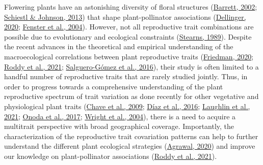 \documentclass[
  12pt,
  a4paper,
]{article}
\begin{document}
Flowering plants have an astonishing diversity of floral structures (\protect\hyperlink{ref-barrett2002}{Barrett, 2002}; \protect\hyperlink{ref-schiestl2013}{Schiestl \& Johnson, 2013}) that shape plant-pollinator associations (\protect\hyperlink{ref-dellinger2020}{Dellinger, 2020}; \protect\hyperlink{ref-fenster2004}{Fenster et al., 2004}). However, not all reproductive trait combinations are possible due to evolutionary and ecological constraints (\protect\hyperlink{ref-stearns1989}{Stearns, 1989}). Despite the recent advances in the theoretical and empirical understanding of the macroecological correlations between plant reproductive traits (\protect\hyperlink{ref-friedman2020}{Friedman, 2020}; \protect\hyperlink{ref-roddy2021}{Roddy et al., 2021}; \protect\hyperlink{ref-salguero2016}{Salguero-Gómez et al., 2016}), their study is often limited to a handful number of reproductive traits that are rarely studied jointly. Thus, in order to progress towards a comprehensive understanding of the plant reproductive spectrum of trait variation as done recently for other vegetative and physiological plant traits (\protect\hyperlink{ref-chave2009}{Chave et al., 2009}; \protect\hyperlink{ref-diaz2016}{Díaz et al., 2016}; \protect\hyperlink{ref-laughlin2021}{Laughlin et al., 2021}; \protect\hyperlink{ref-onoda2017}{Onoda et al., 2017}; \protect\hyperlink{ref-wright2004}{Wright et al., 2004}), there is a need to acquire a multitrait perspective with broad geographical coverage. Importantly, the characterization of the reproductive trait covariation patterns can help to further understand the different plant ecological strategies (\protect\hyperlink{ref-agrawal2020}{Agrawal, 2020}) and improve our knowledge on plant-pollinator associations (\protect\hyperlink{ref-roddy2021}{Roddy et al., 2021}).
\end{document}
